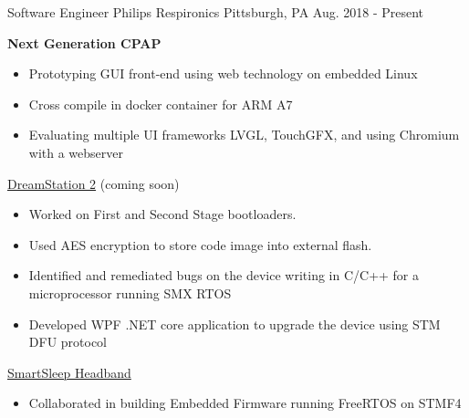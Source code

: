 


\begin{cventries}


\cventry
{Software Engineer} %
{Philips Respironics} %
{Pittsburgh, PA} %
{Aug. 2018 - Present} %
{ %
\begin{cvitems}
\item 
{
    \textbf{Next Generation CPAP} 
    \begin{itemize}
        \item Prototyping GUI front-end using web technology on embedded Linux
        \item Cross compile in docker container for ARM A7
        \item Evaluating multiple UI frameworks LVGL, TouchGFX, and using Chromium with a webserver
    \end{itemize} 
}
\item 
{
    \href{https://www.usa.philips.com/healthcare/product/HCNOCTN447/dreamstation-cpap-bi-level-therapy-systems}{\color{RoyalBlue}DreamStation 2} 
    (coming soon)
    \begin{itemize}
        \item Worked on First and Second Stage bootloaders. 
        \item Used AES encryption to store code image into external flash. 
        \item Identified and remediated bugs on the device writing in C/C++ for a microprocessor running SMX RTOS
        \item Developed WPF .NET core application to upgrade the device using STM DFU protocol
    \end{itemize} 
}
\item 
{
    \href{https://www.usa.philips.com/c-e/smartsleep/deep-sleep-headband.html}{\color{RoyalBlue}SmartSleep Headband} 
    \begin{itemize}
        \item Collaborated in building Embedded Firmware running FreeRTOS on STMF4

\end{itemize}}
\end{cvitems}}
\end{cventries}
